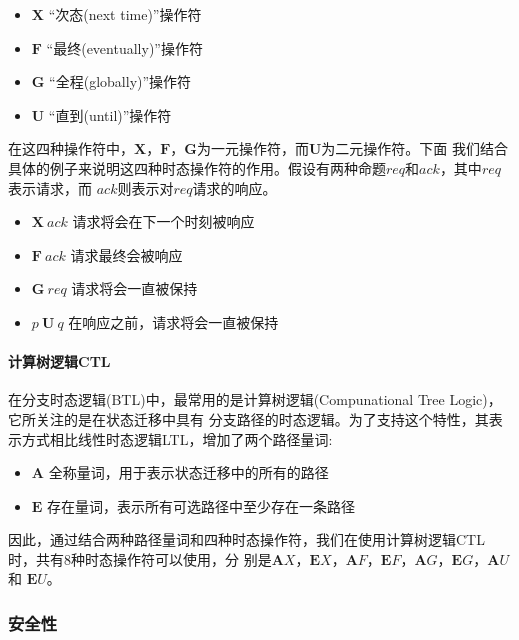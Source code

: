 \begin{itemize}
\item $\mathbf X$ ``次态(next time)''操作符
\item $\mathbf F$ ``最终(eventually)''操作符
\item $\mathbf G$ ``全程(globally)''操作符
\item $\mathbf U$ ``直到(until)''操作符
\end{itemize}

在这四种操作符中，$\mathbf X$，$\mathbf F$，$\mathbf G$为一元操作符，而$\mathbf U$为二元操作符。下面
我们结合具体的例子来说明这四种时态操作符的作用。假设有两种命题$req$和$ack$，其中$req$表示请求，而
$ack$则表示对$req$请求的响应。

\begin{itemize}
\item $\mathbf{X}\ ack$ 请求将会在下一个时刻被响应
\item $\mathbf{F}\ ack$ 请求最终会被响应
\item $\mathbf{G}\ req$ 请求将会一直被保持
\item $p\ \mathbf{U}\ q$ 在响应之前，请求将会一直被保持
\end{itemize}

\paragraph{计算树逻辑CTL}
\label{sec:ctl}

在分支时态逻辑(BTL)中，最常用的是计算树逻辑(Compunational Tree Logic)，它所关注的是在状态迁移中具有
分支路径的时态逻辑。为了支持这个特性，其表示方式相比线性时态逻辑LTL，增加了两个路径量词:

\begin{itemize}
\item $\mathbf A$ 全称量词，用于表示状态迁移中的所有的路径
\item $\mathbf E$ 存在量词，表示所有可选路径中至少存在一条路径
\end{itemize} 

因此，通过结合两种路径量词和四种时态操作符，我们在使用计算树逻辑CTL时，共有8种时态操作符可以使用，分
别是$\mathbf AX$，$\mathbf EX$，$\mathbf AF$，$\mathbf EF$，$\mathbf AG$，$\mathbf EG$，$\mathbf
AU$ 和 $\mathbf EU$。


\subsubsection{安全性}
\label{sec:safety}

